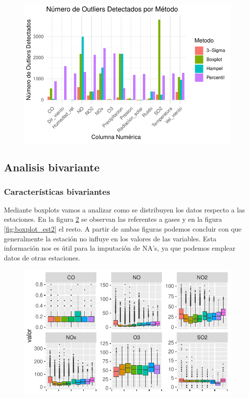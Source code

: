 \documentclass[notspecified,article,submit,moreauthors,pdftex]{Definitions/mdpi}
\begin{document}
\begin{figure}

\includegraphics[width=0.7\linewidth]{ProyectoAED2023_files/figure-latex/ourliers_univ-1} \hfill{}

\caption{\label{fig:outliers_univ}}\label{fig:ourliers_univ}
\end{figure}

\hypertarget{analisis-bivariante}{%
\subsection{Analisis bivariante}\label{analisis-bivariante}}

\hypertarget{caracteruxedsticas-bivariantes}{%
\subsubsection{Características
bivariantes}\label{caracteruxedsticas-bivariantes}}

Mediante boxplots vamos a analizar como se distribuyen los datos
respecto a las estaciones. En la figura \ref{fig:boxplot_est1} se
observan las referentes a gases y en la figura \ref{fig:boxplot_est2} el
resto. A partir de ambas figuras podemos concluir con que generalmente
la estación no influye en los valores de las variables. Esta información
nos es útil para la imputación de NA's, ya que podemos emplear datos de
otras estaciones.

\begin{figure}

\includegraphics[width=0.7\linewidth]{ProyectoAED2023_files/figure-latex/boxplot_est1-1} \hfill{}

\caption{\label{fig:boxplot_est1}}\label{fig:boxplot_est1}
\end{figure}
\end{document}
